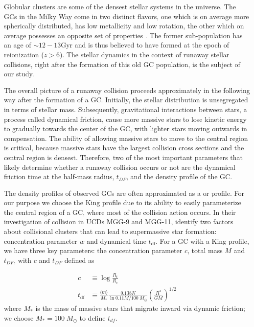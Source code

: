 \documentclass[preprint1]{aastex}
\newcommand\Msun{\; M_\odot}
\newcommand\msun{\; M_\odot}
\numberwithin{equation}{section}
\begin{document}
Globular clusters are some of the densest stellar systems in the universe. 
The GCs in the Milky Way come in two distinct flavors,
one which is on average more spherically distributed, has low metallicity 
and low rotation, the other which on average possesses an opposite set of properties
\citep[][]{1985Zinn}.
The former sub-population has an age of $\sim 12-13$Gyr and is thus believed
to have formed at the epoch of reionization ($z>6$).
The stellar dynamics in the context of runaway stellar collisions,
right after the formation of this old GC population, is the subject of our study.


The overall picture of a runaway collision proceeds approximately in the following way
after the formation of a GC.
Initially, the stellar distribution is unsegregated in terms of stellar mass.
Subsequently, gravitational interactions between stars, a process called dynamical friction,
cause more massive stars to lose
kinetic energy to gradually towards the center of the GC, with lighter stars moving outwards in compensation.
The ability of allowing massive stars to move to the central region is critical, because
massive stars have the largest collision cross sections and the central region is densest.
Therefore, two of the most important parameters that likely determine whether
a runaway collision occurs or not 
are the dynamical friction time at the half-mass radius, $t_{DF}$, and the density profile of the GC.

The density profiles of observed GCs are often approximated as 
a \citet[][]{1911Plummer} or \citet[][]{1962King} profile.
For our purpose we choose the King profile due to its ability to easily parameterize
the central region of a GC, where most of the collision action occurs.
In their investigation of collision in 
UCDs MGG-9 and MGG-11, \citet{2004SPZ} identify two factors about collisional clusters that can lead to supermassive star formation: 
concentration parameter $w$ and dynamical time $t_{\mathrm{df}}$.
For a GC with a King profile, we have three key parameters:
the concentration parameter $c$, total mass $M$ and $t_{DF}$, 
with $c$ and $t_{DF}$ defined as 

\begin{subequations}
    \begin{align*}
    c &\equiv \log{\frac{R_t}{R_c}} \\
    t_{\mathrm{df}} &\equiv \frac{\langle m \rangle}{M_*} \frac{0.138N}{\ln{0.11M/100\Msun}}\left(\frac{R^3}{GM}\right)^{1/2}
    \end{align*}
\end{subequations} 
\noindent
where $M_*$ is the mass of massive stars that migrate inward via dynamic friction;
we choose $M_*=100\msun$ to define $t_{df}$.
\end{document}
